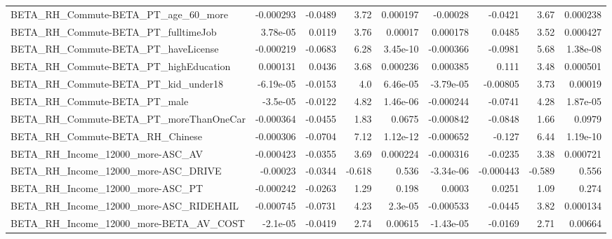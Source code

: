 \begin{tabular}{lrrrrrrrr}
BETA\_RH\_Commute-BETA\_PT\_age\_60\_more                &   -0.000293 &      -0.0489 &      3.72 & 0.000197 &   -0.00028 &     -0.0421 &         3.67 &      0.000238 \\
BETA\_RH\_Commute-BETA\_PT\_fulltimeJob                &    3.78e-05 &       0.0119 &      3.76 &  0.00017 &   0.000178 &      0.0485 &         3.52 &      0.000427 \\
BETA\_RH\_Commute-BETA\_PT\_haveLicense                &   -0.000219 &      -0.0683 &      6.28 & 3.45e-10 &  -0.000366 &     -0.0981 &         5.68 &      1.38e-08 \\
BETA\_RH\_Commute-BETA\_PT\_highEducation              &    0.000131 &       0.0436 &      3.68 & 0.000236 &   0.000385 &       0.111 &         3.48 &      0.000501 \\
BETA\_RH\_Commute-BETA\_PT\_kid\_under18                &   -6.19e-05 &      -0.0153 &       4.0 & 6.46e-05 &  -3.79e-05 &    -0.00805 &         3.73 &       0.00019 \\
BETA\_RH\_Commute-BETA\_PT\_male                       &    -3.5e-05 &      -0.0122 &      4.82 & 1.46e-06 &  -0.000244 &     -0.0741 &         4.28 &      1.87e-05 \\
BETA\_RH\_Commute-BETA\_PT\_moreThanOneCar             &   -0.000364 &      -0.0455 &      1.83 &   0.0675 &  -0.000842 &     -0.0848 &         1.66 &        0.0979 \\
BETA\_RH\_Commute-BETA\_RH\_Chinese                    &   -0.000306 &      -0.0704 &      7.12 & 1.12e-12 &  -0.000652 &      -0.127 &         6.44 &      1.19e-10 \\
BETA\_RH\_Income\_12000\_more-ASC\_AV                   &   -0.000423 &      -0.0355 &      3.69 & 0.000224 &  -0.000316 &     -0.0235 &         3.38 &      0.000721 \\
BETA\_RH\_Income\_12000\_more-ASC\_DRIVE                &    -0.00023 &      -0.0344 &    -0.618 &    0.536 &  -3.34e-06 &   -0.000443 &       -0.589 &         0.556 \\
BETA\_RH\_Income\_12000\_more-ASC\_PT                   &   -0.000242 &      -0.0263 &      1.29 &    0.198 &     0.0003 &      0.0251 &         1.09 &         0.274 \\
BETA\_RH\_Income\_12000\_more-ASC\_RIDEHAIL             &   -0.000745 &      -0.0731 &      4.23 &  2.3e-05 &  -0.000533 &     -0.0445 &         3.82 &      0.000134 \\
BETA\_RH\_Income\_12000\_more-BETA\_AV\_COST             &    -2.1e-05 &      -0.0419 &      2.74 &  0.00615 &  -1.43e-05 &     -0.0169 &         2.71 &       0.00664 \\

\end{tabular}
